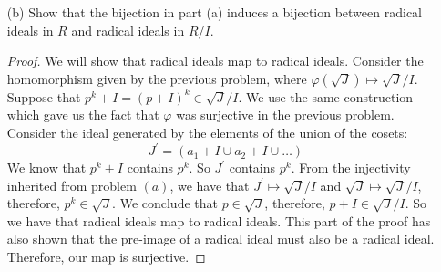 \documentclass{article}
\begin{document}
\begin{itemize}
\begin{proof}
                (Surjectivity) Consider an ideal of $R/I$ which is generated by a number of cosets:
                    \begin{equation*}
                        J = (a_{1} + I, a_{2} + I, \ldots ) \in R/I
                    \end{equation*}
                Consider the ideal generated by the elements of the union of the cosets:
                    \begin{equation*}
                        J^{\prime} = (a_{1} + I \cup a_{2} + I \cup \ldots )
                    \end{equation*}
                ($J \subseteq \varphi(J^{\prime})$) Clearly, $J^{\prime}$ maps surjectively into $J$ by $\varphi$. We just take $a_{1} + i \mapsto a_{1} + i + I = a_{1} + I$. So we have a way to mapping to the generators. 

                ($\varphi(J^{\prime}) \subseteq J$) Now consider an arbitrary element of $J^{\prime}$ which is of the form:
                    \begin{equation*}
                        r_{1}(a_{1} + i_{1}) + r_{2}(a_{2} + i_{2}) + \ldots \mapsto r_{1}a_{1} + r_{2}a_{2} + \ldots + I
                    \end{equation*}
                which is an element of $J/I$. Therefore, we have that $\varphi(J^{\prime}) = J$ by our double inclusion proof, showing that $\varphi$ is surjective.
            \end{proof}

        \item [(b)] Show that the bijection in part (a) induces a bijection between radical ideals in $R$ and radical ideals in $R/I$.
            \begin{proof}
                We will show that radical ideals map to radical ideals. Consider the homomorphism given by the previous problem, where $\varphi(\sqrt{J}) \mapsto \sqrt{J}/I$. Suppose that $p^{k} + I = (p + I)^{k} \in \sqrt{J}/I$. We use the same construction which gave us the fact that $\varphi$ was surjective in the previous problem. Consider the ideal generated by the elements of the union of the cosets:
                    \begin{equation*}
                        J^{\prime} = (a_{1} + I \cup a_{2} + I \cup \ldots )
                    \end{equation*}
                We know that $p^{k} + I$ contains $p^{k}$. So $J^{\prime}$ contains $p^{k}$. From the injectivity inherited from problem $(a)$, we have that $J^{\prime} \mapsto \sqrt{J}/I$ and $\sqrt{J} \mapsto \sqrt{J}/I$, therefore, $p^{k} \in \sqrt{J}$. We conclude that $p \in \sqrt{J}$, therefore, $p + I \in \sqrt{J}/I$. So we have that radical ideals map to radical ideals. This part of the proof has also shown that the pre-image of a radical ideal must also be a radical ideal. Therefore, our map is surjective.
            \end{proof}


\end{itemize}
\end{document}
